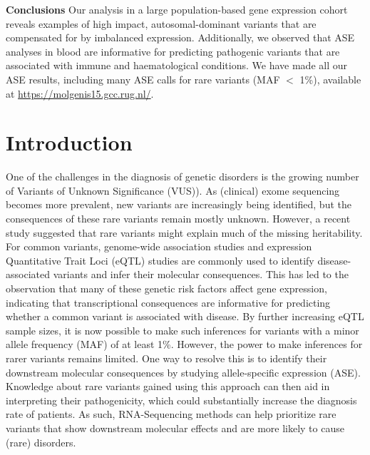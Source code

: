 \textbf{Conclusions} Our analysis in a large population-based gene expression cohort reveals examples of high impact, autosomal-dominant variants that are compensated for by imbalanced expression. Additionally, we observed that ASE analyses in blood are informative for predicting pathogenic variants that  are associated with immune and haematological conditions. We have made all our ASE results, including many ASE calls for rare variants (MAF $<$ 1\%), available at \url{https://molgenis15.gcc.rug.nl/}. 

\section{Introduction}
One of the challenges in the diagnosis of genetic disorders is the growing number of Variants of Unknown Significance (VUS)\cite{hoffman-andrewsKnownUnknownChallenges2018,direstaNextgenerationSequencingApproach2018}). As (clinical) exome sequencing becomes more prevalent, new variants are increasingly being identified, but the consequences of these rare variants remain mostly unknown. However, a recent study suggested that rare variants might explain much of the missing heritability\cite{wainschteinRecoveryTraitHeritability2019}. For common variants, genome-wide association studies and expression Quantitative Trait Loci (eQTL) studies\cite{zhernakovaIdentificationContextdependentExpression2017b,aguetGeneticEffectsGene2017,vosaUnravelingPolygenicArchitecture2018a} are commonly used to identify disease-associated variants and infer their molecular consequences. This has led to the observation that many of these genetic risk factors affect gene expression, indicating that transcriptional consequences are informative for predicting whether a common variant is associated with disease. By further increasing eQTL sample sizes, it is now possible to make such inferences for variants with a minor allele frequency (MAF) of at least 1\%\cite{vosaUnravelingPolygenicArchitecture2018a}. However, the power to make inferences for rarer variants remains limited. One way to resolve this is to identify their downstream molecular consequences by studying allele-specific expression (ASE)\cite{bombaImpactRareLowfrequency2017}. Knowledge about rare variants gained using this approach can then aid in interpreting their pathogenicity, which could substantially increase the diagnosis rate of patients\cite{macarthurGuidelinesInvestigatingCausality2014,kremerGeneticDiagnosisMendelian2017}. As such, RNA-Sequencing methods can help prioritize rare variants that show downstream molecular effects and are more likely to cause (rare) disorders.

